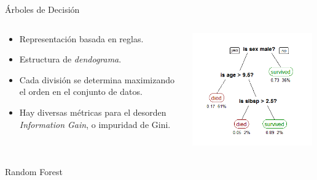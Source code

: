 \documentclass[11pt]{beamer}
\begin{document}
\begin{frame}{\'Arboles de Decisi\'on}
    \begin{columns}
    \begin{column}{0.5\textwidth}
    \begin{itemize}
        \item Representaci\'on basada en reglas.
        \item Estructura de \textit{dendograma}.
        \item Cada divisi\'on se determina maximizando el orden en el conjunto de datos.
        \item Hay diversas m\'etricas para el desorden \textit{Information Gain}, o impuridad de Gini.
    \end{itemize}
    \end{column}
    
    \begin{column}{0.5\textwidth}
    \begin{center}
    \includegraphics[width=0.98\textwidth]{images/CART_tree_titanic_survivors.png}
    \end{center}
    \end{column}
    
    \end{columns}
\end{frame}
\begin{frame}{Random Forest}
    
\end{frame}
\end{document}
